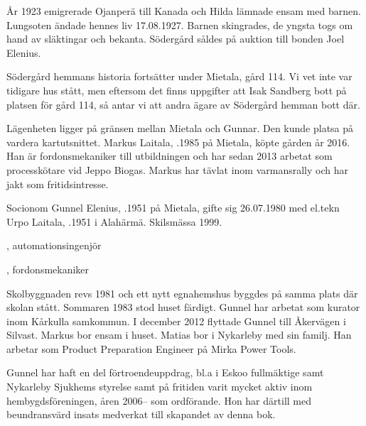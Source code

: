 År 1923 emigrerade Ojanperä till Kanada och Hilda lämnade ensam med barnen. Lungsoten ändade hennes liv 17.08.1927. Barnen skingrades, de yngsta togs om hand av släktingar och bekanta. Södergård såldes på auktion till bonden Joel Elenius.

Södergård hemmans historia fortsätter under Mietala, gård 114. Vi vet inte var tidigare hus stått, men eftersom det finns uppgifter att Isak Sandberg bott på platsen för gård 114, så antar vi att andra ägare av Södergård hemman bott där.


%



%
Lägenheten ligger på gränsen mellan Mietala och Gunnar. Den kunde platsa på vardera kartutsnittet. Markus Laitala, .1985 på Mietala, köpte gården år 2016. Han är fordonsmekaniker till utbildningen och har sedan 2013 arbetat som processkötare vid Jeppo Biogas. Markus har tävlat inom varmansrally och har jakt som fritidsintresse.\jhvspace{}


%
Socionom Gunnel Elenius, .1951 på Mietala, gifte sig 26.07.1980 med el.tekn Urpo Laitala, .1951 i Alahärmä. Skilsmässa 1999.
\begin{jhchildren}
  \item {}, automationsingenjör
  \item {}, fordonsmekaniker
\end{jhchildren}

Skolbyggnaden revs 1981 och ett nytt egnahemshus byggdes på samma plats där skolan stått. Sommaren 1983 stod huset färdigt. Gunnel har arbetat som kurator inom Kårkulla samkommun. I december 2012 flyttade Gunnel till Åkervägen i Silvast. Markus bor ensam i huset. Matias bor i Nykarleby med sin familj. Han arbetar som Product Preparation Engineer på Mirka Power Tools.

Gunnel har haft en del förtroendeuppdrag, bl.a i  Eskoo fullmäktige samt Nykarleby Sjukhems styrelse samt på fritiden varit mycket aktiv inom hembygdsföreningen, åren 2006-- som ordförande. Hon har därtill med beundransvärd insats medverkat till skapandet av denna bok.



